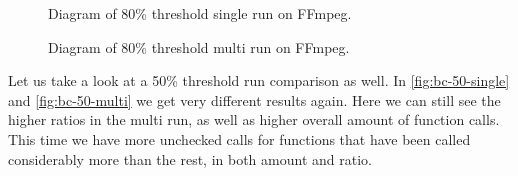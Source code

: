 \begin{figure}[H]
	\caption{Diagram of 80\% threshold single run on FFmpeg.}
	\label{fig:ff-80-single}
\end{figure}

\begin{figure}[H]
	\caption{Diagram of 80\% threshold multi run on FFmpeg.}
	\label{fig:ff-80-multi}
\end{figure}

Let us take a look at a 50\% threshold run comparison as well. In \cref{fig:bc-50-single} and \cref{fig:bc-50-multi} we get very different
results again. Here we can still see the higher ratios in the multi run, as well as higher overall amount of function calls. This time we
have more unchecked calls for functions that have been called considerably more than the rest, in both amount and ratio.

